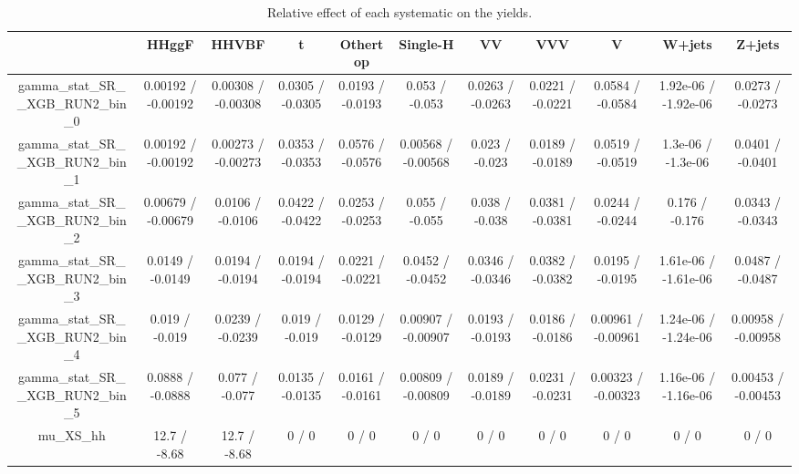 \documentclass[10pt]{article}
\begin{document}
\begin{table}[htbp]
\begin{center}
\begin{tabular}{|c|c|c|c|c|c|c|c|c|c|c|}
\hline 
      & HHggF      & HHVBF      & t      & Othertop      & Single-H      & VV      & VVV      & V      & W+jets      & Z+jets \\ 
\hline 
  gamma_stat_SR__XGB_RUN2_bin_0 & 0.00192 / -0.00192 & 0.00308 / -0.00308 & 0.0305 / -0.0305 & 0.0193 / -0.0193 & 0.053 / -0.053 & 0.0263 / -0.0263 & 0.0221 / -0.0221 & 0.0584 / -0.0584 & 1.92e-06 / -1.92e-06 & 0.0273 / -0.0273 \\ 
  gamma_stat_SR__XGB_RUN2_bin_1 & 0.00192 / -0.00192 & 0.00273 / -0.00273 & 0.0353 / -0.0353 & 0.0576 / -0.0576 & 0.00568 / -0.00568 & 0.023 / -0.023 & 0.0189 / -0.0189 & 0.0519 / -0.0519 & 1.3e-06 / -1.3e-06 & 0.0401 / -0.0401 \\ 
  gamma_stat_SR__XGB_RUN2_bin_2 & 0.00679 / -0.00679 & 0.0106 / -0.0106 & 0.0422 / -0.0422 & 0.0253 / -0.0253 & 0.055 / -0.055 & 0.038 / -0.038 & 0.0381 / -0.0381 & 0.0244 / -0.0244 & 0.176 / -0.176 & 0.0343 / -0.0343 \\ 
  gamma_stat_SR__XGB_RUN2_bin_3 & 0.0149 / -0.0149 & 0.0194 / -0.0194 & 0.0194 / -0.0194 & 0.0221 / -0.0221 & 0.0452 / -0.0452 & 0.0346 / -0.0346 & 0.0382 / -0.0382 & 0.0195 / -0.0195 & 1.61e-06 / -1.61e-06 & 0.0487 / -0.0487 \\ 
  gamma_stat_SR__XGB_RUN2_bin_4 & 0.019 / -0.019 & 0.0239 / -0.0239 & 0.019 / -0.019 & 0.0129 / -0.0129 & 0.00907 / -0.00907 & 0.0193 / -0.0193 & 0.0186 / -0.0186 & 0.00961 / -0.00961 & 1.24e-06 / -1.24e-06 & 0.00958 / -0.00958 \\ 
  gamma_stat_SR__XGB_RUN2_bin_5 & 0.0888 / -0.0888 & 0.077 / -0.077 & 0.0135 / -0.0135 & 0.0161 / -0.0161 & 0.00809 / -0.00809 & 0.0189 / -0.0189 & 0.0231 / -0.0231 & 0.00323 / -0.00323 & 1.16e-06 / -1.16e-06 & 0.00453 / -0.00453 \\ 
  mu_XS_hh & 12.7 / -8.68 & 12.7 / -8.68 & 0 / 0 & 0 / 0 & 0 / 0 & 0 / 0 & 0 / 0 & 0 / 0 & 0 / 0 & 0 / 0 \\ 
\hline 
\end{tabular} 
\caption{Relative effect of each systematic on the yields.} 
\end{center} 
\end{table} 
\end{document}
